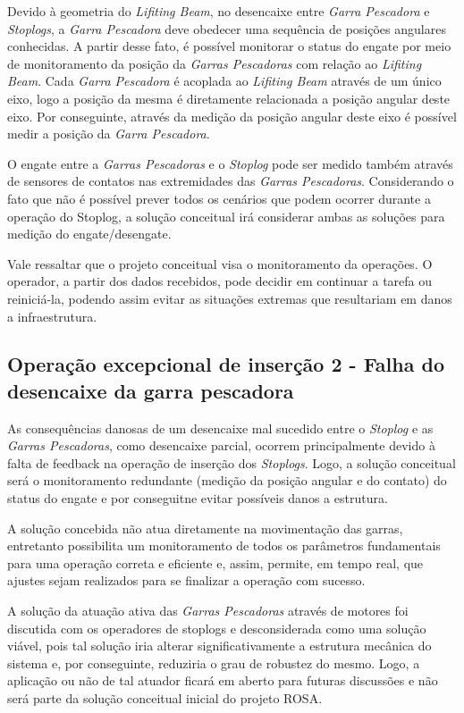 Devido à geometria do \emph{Lifiting Beam}, no
desencaixe entre \emph{Garra Pescadora} e \emph{Stoplogs}, a \emph{Garra
Pescadora} deve obedecer uma sequência de posições angulares conhecidas. A
partir desse fato, é possível monitorar o status do engate por meio de monitoramento da posição da \emph{Garras Pescadoras} com relação ao \emph{Lifiting Beam}.
Cada \emph{Garra Pescadora} é acoplada ao \emph{Lifiting Beam} através de um único eixo, logo a posição da mesma é diretamente relacionada a posição angular deste eixo. Por conseguinte, através da medição da posição angular deste eixo é possível medir a posição da \emph{Garra Pescadora}. 

O engate entre a \emph{Garras Pescadoras} e o \emph{Stoplog} pode ser medido
também através de sensores de contatos nas extremidades das \emph{Garras Pescadoras}.
Considerando o fato que não é possível prever todos os cenários que podem
ocorrer durante a operação do Stoplog, a solução conceitual irá considerar ambas
as soluções para medição do engate/desengate.

Vale ressaltar que o projeto conceitual visa o monitoramento da operações. O
operador, a partir dos dados recebidos, pode decidir em continuar a tarefa ou
reiniciá-la, podendo assim evitar as situações extremas que resultariam em danos a infraestrutura. 


\subsection{Operação excepcional de inserção 2 - Falha do desencaixe da garra pescadora}
\label{op:sol:ins:1}

As consequências danosas de um desencaixe mal sucedido entre o \emph{Stoplog} e
as \emph{Garras Pescadoras}, como desencaixe parcial, ocorrem
principalmente devido à falta de feedback na operação de inserção dos \emph{Stoplogs}.
Logo, a solução conceitual será o monitoramento redundante (medição da posição angular e do contato) do status do engate e por conseguitne evitar possíveis danos a estrutura. 

A solução concebida não atua diretamente na movimentação das garras, entretanto
possibilita um monitoramento de todos os parâmetros fundamentais para uma operação correta e eficiente e, assim, permite, em tempo real, que ajustes sejam realizados para se finalizar a
operação com sucesso. 

A solução da atuação ativa das \emph{Garras Pescadoras} através de motores foi
discutida com os operadores de stoplogs e desconsiderada como uma solução
viável, pois tal solução iria alterar significativamente a estrutura mecânica do sistema e, por conseguinte, reduziria o grau de robustez do mesmo. Logo, a aplicação ou não de tal atuador ficará em aberto para futuras discussões e não será parte da solução conceitual inicial do projeto ROSA.

